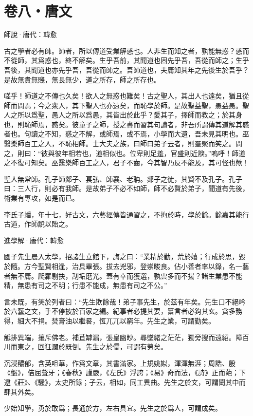 \documentclass[12pt,a4paper]{ctexbook}
\begin{document}
\section{卷八・唐文}
師說·唐代：韓愈 \par
古之學者必有師。師者，所以傳道受業解惑也。人非生而知之者，孰能無惑？惑而不從師，其爲惑也，終不解矣。生乎吾前，其聞道也固先乎吾，吾從而師之；生乎吾後，其聞道也亦先乎吾，吾從而師之。吾師道也，夫庸知其年之先後生於吾乎？是故無貴無賤，無長無少，道之所存，師之所存也。\par
嗟乎！師道之不傳也久矣！欲人之無惑也難矣！古之聖人，其出人也遠矣，猶且從師而問焉；今之衆人，其下聖人也亦遠矣，而恥學於師。是故聖益聖，愚益愚。聖人之所以爲聖，愚人之所以爲愚，其皆出於此乎？愛其子，擇師而教之；於其身也，則恥師焉，惑矣。彼童子之師，授之書而習其句讀者，非吾所謂傳其道解其惑者也。句讀之不知，惑之不解，或師焉，或不焉，小學而大遺，吾未見其明也。巫醫樂師百工之人，不恥相師。士大夫之族，曰師曰弟子云者，則羣聚而笑之。問之，則曰：“彼與彼年相若也，道相似也。位卑則足羞，官盛則近諛。”嗚呼！師道之不復可知矣。巫醫樂師百工之人，君子不齒，今其智乃反不能及，其可怪也歟！\par
聖人無常師。孔子師郯子、萇弘、師襄、老聃。郯子之徒，其賢不及孔子。孔子曰：三人行，則必有我師。是故弟子不必不如師，師不必賢於弟子，聞道有先後，術業有專攻，如是而已。\par
李氏子蟠，年十七，好古文，六藝經傳皆通習之，不拘於時，學於餘。餘嘉其能行古道，作師說以貽之。\par
進學解·唐代：韓愈 \par
國子先生晨入太學，招諸生立館下，誨之曰：“業精於勤，荒於嬉；行成於思，毀於隨。方今聖賢相逢，治具畢張。拔去兇邪，登崇畯良。佔小善者率以錄，名一藝者無不庸。爬羅剔抉，刮垢磨光。蓋有幸而獲選，孰雲多而不揚？諸生業患不能精，無患有司之不明；行患不能成，無患有司之不公。”\par
言未既，有笑於列者曰：“先生欺餘哉！弟子事先生，於茲有年矣。先生口不絕吟於六藝之文，手不停披於百家之編。紀事者必提其要，纂言者必鉤其玄。貪多務得，細大不捐。焚膏油以繼晷，恆兀兀以窮年。先生之業，可謂勤矣。\par
觝排異端，攘斥佛老。補苴罅漏，張皇幽眇。尋墜緒之茫茫，獨旁搜而遠紹。障百川而東之，回狂瀾於既倒。先生之於儒，可謂有勞矣。\par
沉浸醲郁，含英咀華，作爲文章，其書滿家。上規姚姒，渾渾無涯；周誥、殷《盤》，佶屈聱牙；《春秋》謹嚴，《左氏》浮誇；《易》奇而法，《詩》正而葩；下逮《莊》、《騷》，太史所錄；子云，相如，同工異曲。先生之於文，可謂閎其中而肆其外矣。\par
少始知學，勇於敢爲；長通於方，左右具宜。先生之於爲人，可謂成矣。\par
\end{document}
